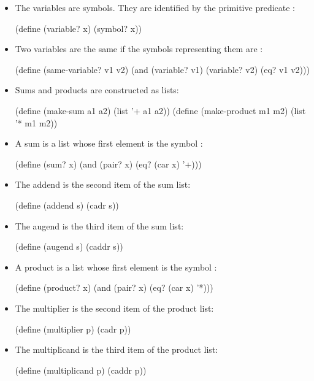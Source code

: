 \begin{itemize}
\item
The variables are symbols.  They are identified by the primitive predicate
:

\begin{codeBlock}
(define (variable? x) (symbol? x))
\end{codeBlock}

\item
Two variables are the same if the symbols representing them are :

\begin{codeBlock}
(define (same-variable? v1 v2)
  (and (variable? v1) (variable? v2) (eq? v1 v2)))
\end{codeBlock}

\item
Sums and products are constructed as lists:

\begin{codeBlock}
(define (make-sum a1 a2) (list '+ a1 a2))
(define (make-product m1 m2) (list '* m1 m2))
\end{codeBlock}

\item
A sum is a list whose first element is the symbol \code{+}:

\begin{codeBlock}
(define (sum? x) (and (pair? x) (eq? (car x) '+)))
\end{codeBlock}

\item
The addend is the second item of the sum list:

\begin{codeBlock}
(define (addend s) (cadr s))
\end{codeBlock}

\item
The augend is the third item of the sum list:

\begin{codeBlock}
(define (augend s) (caddr s))
\end{codeBlock}

\item
A product is a list whose first element is the symbol \code{*}:

\begin{codeBlock}
(define (product? x) (and (pair? x) (eq? (car x) '*)))
\end{codeBlock}

\item
The multiplier is the second item of the product list:

\begin{codeBlock}
(define (multiplier p) (cadr p))
\end{codeBlock}

\item
The multiplicand is the third item of the product list:

\begin{codeBlock}
(define (multiplicand p) (caddr p))
\end{codeBlock}
\end{itemize}

